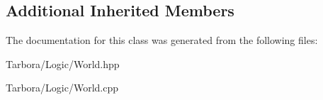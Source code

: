 \subsection*{Additional Inherited Members}


The documentation for this class was generated from the following files\+:\begin{DoxyCompactItemize}
\item 
Tarbora/\+Logic/World.\+hpp\item 
Tarbora/\+Logic/World.\+cpp\end{DoxyCompactItemize}
